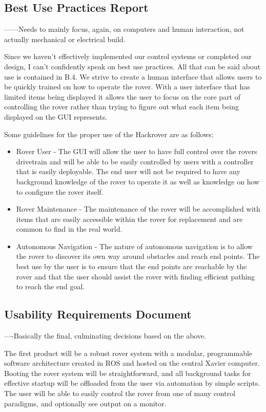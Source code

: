 \documentclass[a4paper, 10pt]{article}
\begin{document}
	\subsection{Best Use Practices Report}
	------Needs to mainly focus, again, on computers and human interaction, not actually mechanical or electrical build. 
	
	Since we haven't effectively implemented our control systems or completed our design, I can't confidently speak on best use practices. All that can be said about use is contained in B.4. We strive to create a human interface that allows users to be quickly trained on how to operate the rover. With a user interface that has limited items being displayed it allows the user to focus on the core part of controlling the rover rather than trying to figure out what each item being displayed on the GUI represents. 
	
	Some guidelines for the proper use of the Hackrover are as follows:

	\begin{itemize}
		\item
		Rover User - The GUI will allow the user to have full control over the rovers drivetrain and will be able to be easily controlled by users with a controller that is easily deployable. The end user will not be required to have any background knowledge of the rover to operate it as well as knowledge on how to configure the rover itself.

		\item
		Rover Maintenance - The maintenance of the rover will be accomplished with items that are easily accessible within the rover for replacement and are common to find in the real world.

		\item
		Autonomous Navigation - The nature of autonomous navigation is to allow the rover to discover its own way around obstacles and reach end points. The best use by the user is to ensure that the end points are reachable by the rover and that the user should assist the rover with finding efficient pathing to reach the end goal. 
\end{itemize}
	
	\subsection{Usability Requirements Document}
	----Basically the final, culminating decisions based on the above.
	
	The first product will be a robust rover system with a modular, programmable software architecture created in ROS and hosted on the central Xavier computer. Booting the rover system will be straightforward, and all background tasks for effective startup will be offloaded from the user via automation by simple scripts. The user will be able to easily control the rover from one of many control paradigms, and optionally see output on a monitor. 
	
\end{document}
